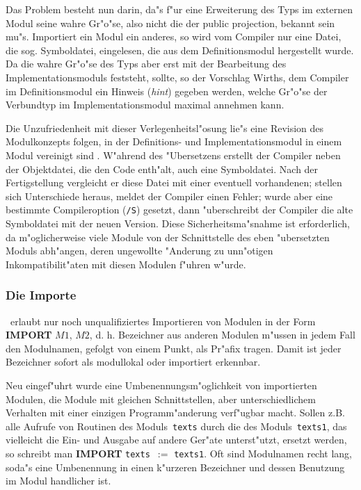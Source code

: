 Das Problem besteht nun darin, da"s f"ur eine Erweiterung des Typs im
externen Modul seine wahre Gr"o"se, also nicht die der public projection,
bekannt sein mu"s.
Importiert ein Modul ein anderes, so wird vom Compiler nur eine Datei,
die sog. Symboldatei, eingelesen, die aus dem Definitionsmodul hergestellt wurde.
Da die wahre Gr"o"se des Typs aber erst mit der Bearbeitung des
Implementationsmoduls feststeht, sollte, so der Vorschlag Wirths, dem
Compiler im Definitionsmodul ein Hinweis ({\it hint\/}) gegeben werden,
welche Gr"o"se der Verbundtyp im Implementationsmodul maximal annehmen kann.

Die Unzufriedenheit mit dieser Verlegenheitsl"osung lie"s eine Revision
des Modulkonzepts folgen, in der Definitions- und Implementationsmodul
in einem Modul vereinigt sind \cite{oberon1,oberon2}.
W"ahrend des "Ubersetzens erstellt der Compiler neben der Objektdatei,
die den Code enth"alt, auch eine Symboldatei.
Nach der Fertigstellung vergleicht er diese Datei mit einer eventuell
vorhandenen;
stellen sich Unterschiede heraus, meldet der Compiler einen Fehler;
wurde aber eine bestimmte Compileroption ({\tt /S}) gesetzt, dann "uberschreibt
der Compiler die alte Symboldatei mit der neuen Version.
Diese Sicherheitsma"snahme ist erforderlich, da m"oglicherweise viele
Module von der Schnittstelle des eben "ubersetzten Moduls abh"angen,
deren ungewollte "Anderung zu unn"otigen Inkompatibilit"aten mit diesen Modulen
f"uhren w"urde.

\subsubsection{Die Importe}

\leavevmode\oberon\ erlaubt nur noch unqualifiziertes Importieren von Modulen in der
Form {\bf IMPORT} $M1$, $M2$, d. h. Bezeichner aus anderen Modulen m"ussen
in jedem Fall den Modulnamen, gefolgt von einem Punkt, als Pr"afix tragen.
Damit ist jeder Bezeichner sofort als modullokal oder importiert erkennbar.

Neu eingef"uhrt wurde eine Umbenennungsm"oglichkeit von importierten Modulen,
die Module mit gleichen Schnittstellen, aber unterschiedlichem Verhalten mit
einer einzigen Programm"anderung verf"ugbar macht.
Sollen z.B. alle Aufrufe von Routinen des Moduls~{\tt texts} durch die des
Moduls~{\tt texts1}, das vielleicht die Ein- und Ausgabe auf andere Ger"ate
unterst"utzt, ersetzt werden, so schreibt man {\bf IMPORT} {\tt texts }$:=$ {\tt texts1}.
Oft sind Modulnamen recht lang, soda"s eine Umbenennung in einen k"urzeren
Bezeichner und dessen Benutzung im Modul handlicher ist.

